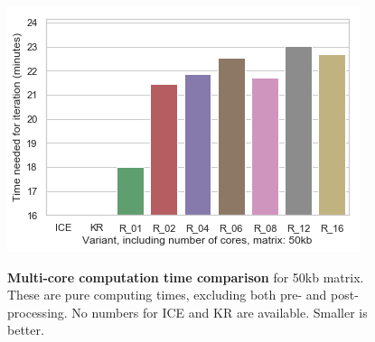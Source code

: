 \begin{figure}[!htbp]
    \begin{centering}
        {\includegraphics[scale=0.8]{figures/results/runtime_multi_50}}
        \caption[Multi-core computation time comparison]
        {\textbf{Multi-core computation time comparison} for 50kb matrix. These are
        pure computing times, excluding both pre- and post-processing. No numbers
        for ICE and KR are available. Smaller is better.}
        \label{fig:mrun50}
    \end{centering}
\end{figure}
